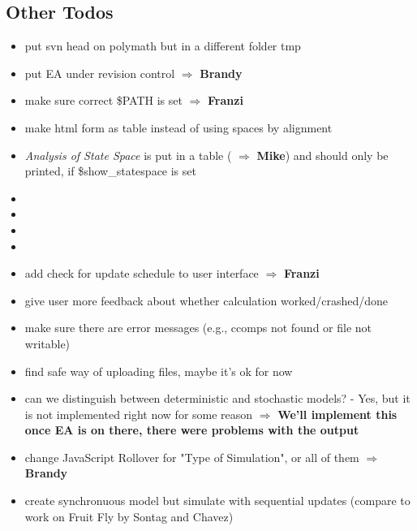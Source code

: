 \documentclass[10pt]{article}
\begin{document}
\subsection*{Other Todos}
\begin{itemize}
    \item put svn head on polymath but in a different folder \/tmp 
    \item put EA under revision control $\Rightarrow$ \textbf{Brandy}
    \item make sure correct \$PATH is set $\Rightarrow$ \textbf{Franzi}
    \item make html form as table instead of using spaces by alignment
    \item \textit{Analysis of State Space} is put in a table ( $\Rightarrow$
    \textbf{Mike}) and should only be printed, if \$show\_statespace is set
    \item {}
    \item {}
    \item {}
    \item {}
    \item add check for update schedule to user interface $\Rightarrow$
    \textbf{Franzi}
    \item give user more feedback about whether calculation worked/crashed/done 
    \item make sure there are error messages (e.g., ccomps not found or file not 
            writable) 
    \item find safe way of uploading files, maybe it's ok for now 
    \item can we distinguish between deterministic and stochastic models? -
    Yes, but it is not implemented right now for some reason $\Rightarrow$
    \textbf{We'll implement this once EA is on there, there were problems with
    the output}
    \item change JavaScript Rollover for "Type of Simulation", or all of them
    $\Rightarrow$ \textbf{Brandy}
    \item create synchronuous model but simulate with sequential updates
    (compare to work on Fruit Fly by Sontag and Chavez)
\end{itemize}
\end{document}

